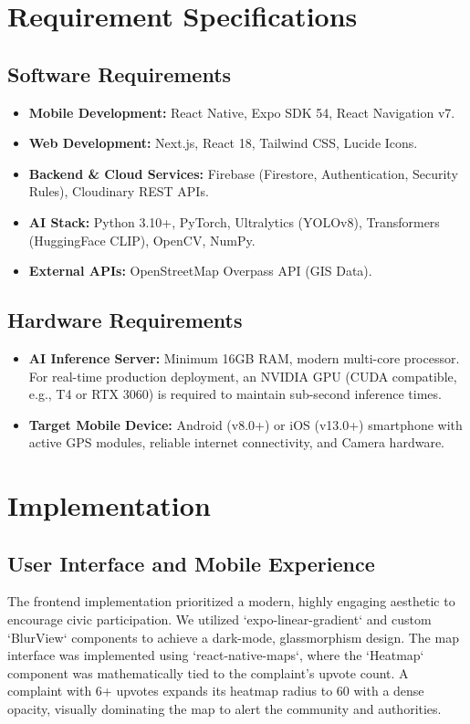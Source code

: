 \documentclass[12pt,a4paper]{report}
\begin{document}
\chapter{Requirement Specifications}
\section{Software Requirements}
\begin{itemize}
    \item \textbf{Mobile Development:} React Native, Expo SDK 54, React Navigation v7.
    \item \textbf{Web Development:} Next.js, React 18, Tailwind CSS, Lucide Icons.
    \item \textbf{Backend \& Cloud Services:} Firebase (Firestore, Authentication, Security Rules), Cloudinary REST APIs.
    \item \textbf{AI Stack:} Python 3.10+, PyTorch, Ultralytics (YOLOv8), Transformers (HuggingFace CLIP), OpenCV, NumPy.
    \item \textbf{External APIs:} OpenStreetMap Overpass API (GIS Data).
\end{itemize}

\section{Hardware Requirements}
\begin{itemize}
    \item \textbf{AI Inference Server:} Minimum 16GB RAM, modern multi-core processor. For real-time production deployment, an NVIDIA GPU (CUDA compatible, e.g., T4 or RTX 3060) is required to maintain sub-second inference times.
    \item \textbf{Target Mobile Device:} Android (v8.0+) or iOS (v13.0+) smartphone with active GPS modules, reliable internet connectivity, and Camera hardware.
\end{itemize}

\chapter{Implementation}
\section{User Interface and Mobile Experience}
The frontend implementation prioritized a modern, highly engaging aesthetic to encourage civic participation. We utilized `expo-linear-gradient` and custom `BlurView` components to achieve a dark-mode, glassmorphism design. The map interface was implemented using `react-native-maps`, where the `Heatmap` component was mathematically tied to the complaint's upvote count. A complaint with 6+ upvotes expands its heatmap radius to 60 with a dense opacity, visually dominating the map to alert the community and authorities.
\end{document}
